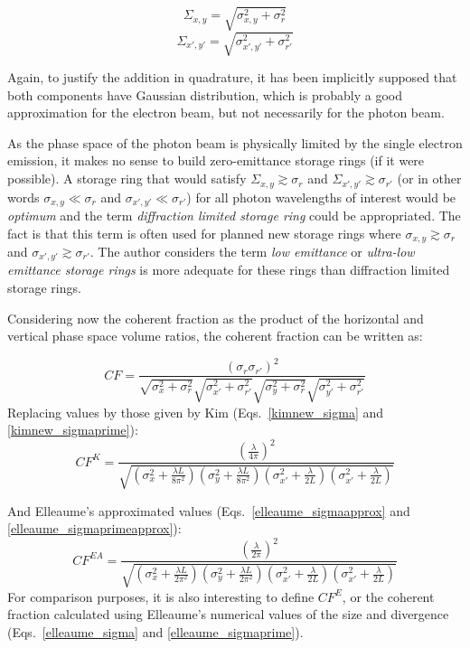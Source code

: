 \documentclass{iucr}              %
\begin{document}
\begin{equation}
\Sigma_{x,y}  = \sqrt{ \sigma_{x,y}^2 + \sigma_{r}^2 }
\end{equation}
\begin{equation}
\Sigma_{x',y'}  = \sqrt{ \sigma_{x',y'}^2 + \sigma_{r'}^2 }
\end{equation}

Again, to justify the addition in quadrature, it has been implicitly supposed that both components have Gaussian distribution, which is probably a good approximation for the electron beam, but not necessarily for the photon beam. 

As the phase space of the photon beam is physically limited by the single electron emission, it makes no sense to build zero-emittance storage rings (if it were possible). A storage ring that would satisfy  $\Sigma_{x,y}  \gtrsim  \sigma_{r}$ and $\Sigma_{x',y'}  \gtrsim  \sigma_{r'}$ (or in other words $\sigma_{x,y} \ll \sigma_{r}$ and $\sigma_{x',y'} \ll \sigma_{r'}$) for all photon wavelengths of interest would be {\it optimum} and the term {\it diffraction limited storage ring} could be appropriated. The fact is that this term is often used for planned new storage rings where  $\sigma_{x,y} \gtrsim \sigma_{r}$ and $\sigma_{x',y'} \gtrsim \sigma_{r'}$. The author considers the term {\it low emittance} or {\it ultra-low emittance storage rings} is more adequate for these rings than diffraction limited storage rings. 

Considering now the coherent fraction as the product of the horizontal and vertical phase space volume ratios, the coherent fraction can be written as:

\begin{equation}
CF = \frac{(\sigma_r \sigma_{r\prime})^2 }{ \sqrt{\sigma_x^2+ \sigma_r^2}  \sqrt{\sigma_{x'}^2+ \sigma_{r\prime}^2} \sqrt{ \sigma_y^2+ \sigma_r^2}  \sqrt{\sigma_{y'}^2+ \sigma_{r'}^2}}
\end{equation}
Replacing values by those given by Kim (Eqs.~\ref{kimnew_sigma} and \ref{kimnew_sigmaprime}): 
\begin{equation}
CF^K = \frac{
\left( \frac{\lambda}{4 \pi} \right)^2}
{\sqrt{ 
\left(\sigma_x^2 + \frac{\lambda L}{8 \pi^2} \right) 
\left(\sigma_y^2 + \frac{\lambda L}{8 \pi^2} \right)
\left(\sigma_{x'}^2 + \frac{\lambda}{2 L} \right)
\left(\sigma_{x'}^2 + \frac{\lambda}{2 L} \right)
}}
\label{cf_kim}
\end{equation}

And Elleaume's approximated values (Eqs.~\ref{elleaume_sigmaapprox} and \ref{elleaume_sigmaprimeapprox}): 
\begin{equation}
CF^{EA} = \frac{
\left( \frac{\lambda}{2 \pi} \right)^2}
{\sqrt{ 
\left(\sigma_x^2 + \frac{\lambda L}{2 \pi^2} \right) 
\left(\sigma_y^2 + \frac{\lambda L}{2 \pi^2} \right)
\left(\sigma_{x'}^2 + \frac{\lambda}{2 L} \right)
\left(\sigma_{x'}^2 + \frac{\lambda}{2 L} \right)
}}
\label{cf_elleaume_approx}
\end{equation}
For comparison purposes, it is also interesting to define $CF^E$, or the coherent fraction calculated using Elleaume's numerical values of the size and divergence (Eqs.~\ref{elleaume_sigma} and \ref{elleaume_sigmaprime}).  
\end{document}
